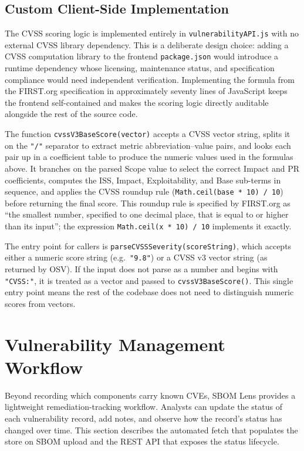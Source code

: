 \subsection{Custom Client-Side Implementation}
\label{sec:cvss-implementation}

The CVSS scoring logic is implemented entirely in \texttt{vulnerabilityAPI.js} with no external CVSS library dependency. This is a deliberate design choice: adding a CVSS computation library to the frontend \texttt{package.json} would introduce a runtime dependency whose licensing, maintenance status, and specification compliance would need independent verification. Implementing the formula from the FIRST.org specification in approximately seventy lines of JavaScript keeps the frontend self-contained and makes the scoring logic directly auditable alongside the rest of the source code.

The function \texttt{cvssV3BaseScore(vector)} accepts a CVSS vector string, splits it on the \texttt{"/"} separator to extract metric abbreviation--value pairs, and looks each pair up in a coefficient table to produce the numeric values used in the formulas above. It branches on the parsed Scope value to select the correct Impact and PR coefficients, computes the ISS, Impact, Exploitability, and Base sub-terms in sequence, and applies the CVSS roundup rule (\texttt{Math.ceil(base * 10) / 10}) before returning the final score. This roundup rule is specified by FIRST.org as ``the smallest number, specified to one decimal place, that is equal to or higher than its input''; the expression \texttt{Math.ceil(x * 10) / 10} implements it exactly.

The entry point for callers is \texttt{parseCVSSSeverity(scoreString)}, which accepts either a numeric score string (e.g.\ \texttt{"9.8"}) or a CVSS v3 vector string (as returned by OSV). If the input does not parse as a number and begins with \texttt{"CVSS:"}, it is treated as a vector and passed to \texttt{cvssV3BaseScore()}. This single entry point means the rest of the codebase does not need to distinguish numeric scores from vectors.


\section{Vulnerability Management Workflow}
\label{sec:vuln-workflow}

Beyond recording which components carry known CVEs, SBOM Lens provides a lightweight remediation-tracking workflow. Analysts can update the status of each vulnerability record, add notes, and observe how the record's status has changed over time. This section describes the automated fetch that populates the store on SBOM upload and the REST API that exposes the status lifecycle.


